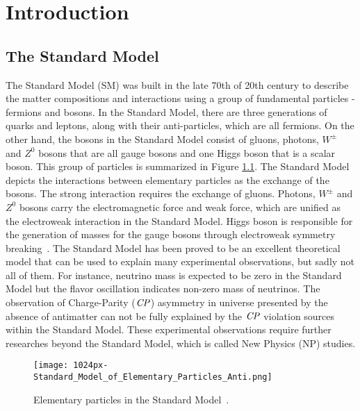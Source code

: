 \chapter{Introduction}

\section{The Standard Model}
The Standard Model (SM) was built in the late 70th of 20th century to  describe the matter compositions and interactions using a group of fundamental particles - fermions and bosons. 
In the Standard Model, there are three generations of quarks and leptons, along with their anti-particles, which are all fermions. On the other hand, the bosons in the Standard Model consist of gluons, photons, $W^{\pm}$ and $Z^0$ bosons that are all gauge bosons and one Higgs boson that is a scalar boson. This group of particles is summarized in Figure \ref{fig:sm-table}. The Standard Model depicts the interactions between elementary particles as the exchange of the bosons. The strong interaction requires the exchange of gluons. Photons, $W^{\pm}$ and $Z^0$ bosons carry the electromagnetic force and weak force, which are unified as the electroweak interaction in the Standard Model. Higgs boson is responsible for the generation of masses for the gauge bosons through electroweak symmetry breaking~\cite{aad2012observation}. The Standard Model has been proved to be an excellent theoretical model that can be used to explain many experimental observations, but sadly not all of them. For instance, neutrino mass is expected to be zero in the Standard Model but the flavor oscillation indicates non-zero mass of neutrinos. The observation of Charge-Parity ($\it{CP}$) asymmetry in universe presented by the absence of antimatter can not be fully explained by the $\it{CP}$ violation sources within the Standard Model. These experimental observations require further researches beyond the Standard Model, which is called New Physics (NP) studies. 
\begin{figure}[H]
	\centering
	\texttt{[image: 1024px-Standard\_Model\_of\_Elementary\_Particles\_Anti.png]}
	\caption{Elementary particles in the Standard Model~\cite{sm_particles}.}
	\label{fig:sm-table}
\end{figure}

